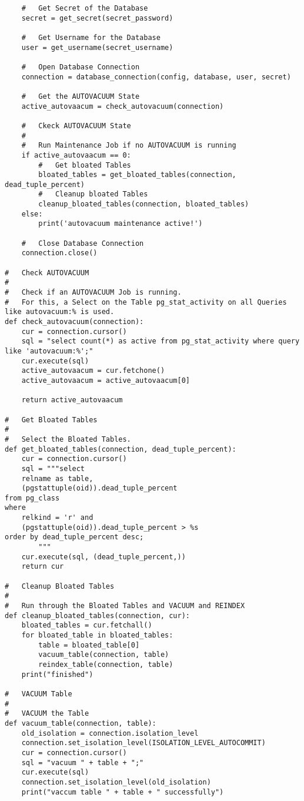 \begin{flushleft}
\begin{lstlisting}
    #   Get Secret of the Database
    secret = get_secret(secret_password)

    #   Get Username for the Database
    user = get_username(secret_username)

    #   Open Database Connection
    connection = database_connection(config, database, user, secret)

    #   Get the AUTOVACUUM State
    active_autovaacum = check_autovacuum(connection)

    #   Ckeck AUTOVACUUM State
    #
    #   Run Maintenance Job if no AUTOVACUUM is running
    if active_autovaacum == 0:
        #   Get bloated Tables
        bloated_tables = get_bloated_tables(connection, dead_tuple_percent)
        #   Cleanup bloated Tables
        cleanup_bloated_tables(connection, bloated_tables)
    else:
        print('autovacuum maintenance active!')

    #   Close Database Connection
    connection.close()

#   Check AUTOVACUUM
#
#   Check if an AUTOVACUUM Job is running.
#   For this, a Select on the Table pg_stat_activity on all Queries like autovacuum:% is used.
def check_autovacuum(connection):
    cur = connection.cursor()
    sql = "select count(*) as active from pg_stat_activity where query like 'autovacuum:%';"
    cur.execute(sql)
    active_autovaacum = cur.fetchone()
    active_autovaacum = active_autovaacum[0]

    return active_autovaacum

#   Get Bloated Tables
#
#   Select the Bloated Tables.
def get_bloated_tables(connection, dead_tuple_percent):
    cur = connection.cursor()
    sql = """select
    relname as table,
    (pgstattuple(oid)).dead_tuple_percent
from pg_class
where
    relkind = 'r' and
    (pgstattuple(oid)).dead_tuple_percent > %s
order by dead_tuple_percent desc;
        """
    cur.execute(sql, (dead_tuple_percent,))
    return cur

#   Cleanup Bloated Tables
#
#   Run through the Bloated Tables and VACUUM and REINDEX
def cleanup_bloated_tables(connection, cur):
    bloated_tables = cur.fetchall()
    for bloated_table in bloated_tables:
        table = bloated_table[0]
        vacuum_table(connection, table)
        reindex_table(connection, table)
    print("finished")

#   VACUUM Table
#
#   VACUUM the Table
def vacuum_table(connection, table):
    old_isolation = connection.isolation_level
    connection.set_isolation_level(ISOLATION_LEVEL_AUTOCOMMIT)
    cur = connection.cursor()
    sql = "vacuum " + table + ";"
    cur.execute(sql)
    connection.set_isolation_level(old_isolation)
    print("vaccum table " + table + " successfully")


\end{lstlisting}
\end{flushleft}
